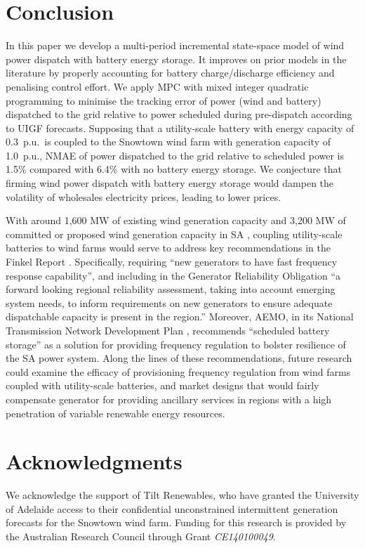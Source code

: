\documentclass[a4paper, 10pt, twocolumn, preprint, 3p]{elsarticle}
\begin{document}
\section{Conclusion}\label{sect:conclusion}
In this paper we develop a multi-period incremental state-space model of wind power dispatch with battery energy storage.  It improves on prior models in the literature by properly accounting for battery charge/discharge efficiency and penalising control effort.  We apply MPC with mixed integer quadratic programming to minimise the tracking error of power (wind and battery) dispatched to the grid relative to power scheduled during pre-dispatch according to UIGF forecasts.  Supposing that a utility-scale battery with energy capacity of 0.3~p.u.\ is coupled to the Snowtown wind farm with generation capacity of 1.0~p.u., NMAE of power dispatched to the grid relative to scheduled power is 1.5\% compared with 6.4\% with no battery energy storage.  We conjecture that firming wind power dispatch with battery energy storage would dampen the volatility of wholesales electricity prices, leading to lower prices.

With around 1,600 MW of existing wind generation capacity and 3,200 MW of committed or proposed wind generation capacity in SA \cite{SAER17}, coupling utility-scale batteries to wind farms would serve to address key recommendations in the Finkel Report \cite{FINKEL17}.  Specifically, requiring ``new generators to have fast frequency response capability'', and including in the Generator Reliability Obligation ``a forward looking regional reliability assessment, taking into account emerging system needs, to inform requirements on new generators to ensure adequate dispatchable capacity is present in the region.''  Moreover, AEMO, in its National Transmission Network Development Plan \cite{NTNDP16}, recommends ``scheduled battery storage'' as a solution for providing frequency regulation to bolster resilience of the SA power system.  Along the lines of these recommendations, future research could examine the efficacy of provisioning frequency regulation from wind farms coupled with utility-scale batteries, and market designs that would fairly compensate generator for providing ancillary services in regions with a high penetration of variable renewable energy resources.

\section*{Acknowledgments}
We acknowledge the support of Tilt Renewables, who have granted the University of Adelaide access to their confidential unconstrained intermittent generation forecasts for the Snowtown wind farm.  Funding for this research is provided by the Australian Research Council through Grant \textit{CE140100049}.


\end{document}
